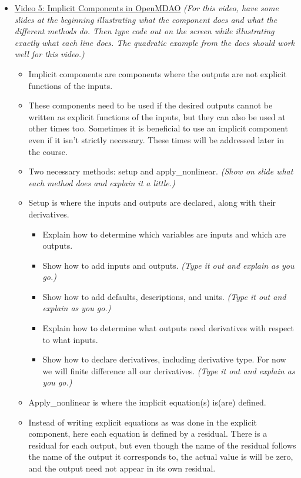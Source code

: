 \documentclass[12pt, letterpaper]{article}
\begin{document}
\begin{itemize}
	\item \underline{Video 5: Implicit Components in OpenMDAO} \textit{(For this video, have some slides at the beginning illustrating what the 				component does and what the different methods do. Then type code out on the screen while illustrating exactly what each line does. The 					quadratic example from the docs should work well for this video.)}
		\begin{itemize}
			\item Implicit components are components where the outputs are not explicit functions of the inputs.
			\item These components need to be used if the desired outputs cannot be written as explicit functions of the inputs, but they can also be 					used at other times too. Sometimes it is beneficial to use an implicit component even if it isn't strictly necessary. These times will be addressed later in the course.
			\item Two necessary methods: setup and apply\_nonlinear. \textit{(Show on slide what each method does and explain it a little.)}
			\item Setup is where the inputs and outputs are declared, along with their derivatives.
				\begin{itemize}
					\item Explain how to determine which variables are inputs and which are outputs.
					\item Show how to add inputs and outputs. \textit{(Type it out and explain as you go.)}
					\item Show how to add defaults, descriptions, and units. \textit{(Type it out and explain as you go.)}
					\item Explain how to determine what outputs need derivatives with respect to what inputs.
					\item Show how to declare derivatives, including derivative type. For now we will finite difference all our derivatives. \textit{(Type it out and explain as you go.)}
				\end{itemize}
			\item Apply\_nonlinear is where the implicit equation(s) is(are) defined. 
			\item Instead of writing explicit equations as was done in the explicit component, here each equation is defined by a residual. There is a 					residual for each output, but even though the name of the residual follows the name of the output it corresponds to, the actual value is will be zero, and the output need not appear in its own residual.

\end{itemize}
\end{itemize}
\end{document}
